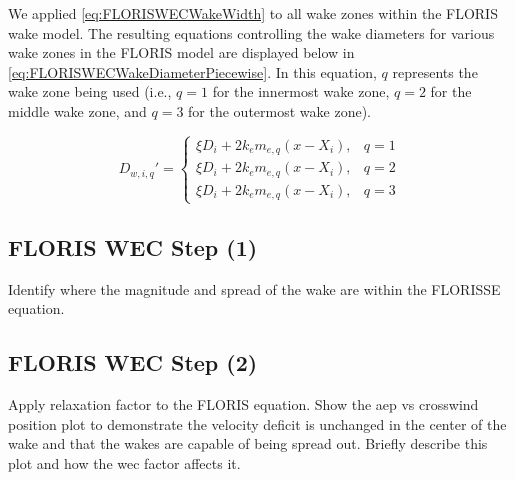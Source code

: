 \documentclass[a4paper]{jpconf}
\begin{document}

We applied \cref{eq:FLORISWECWakeWidth} to all wake zones within the FLORIS wake model. The resulting equations controlling the wake diameters for various wake zones in the FLORIS model are displayed below in \cref{eq:FLORISWECWakeDiameterPiecewise}. In this equation, $q$ represents the wake zone being used (i.e., $q = 1$ for the innermost wake zone, $q = 2$ for the middle wake zone, and $q = 3$ for the outermost wake zone).

\begin{equation}
    D_{w, i, q}' = \begin{cases}
        \xi D_i + 2k_em_{e, q} (x - X_i), & q = 1 \\
        \xi D_i + 2k_em_{e, q} (x - X_i), & q = 2 \\
        \xi D_i + 2k_em_{e, q} (x - X_i), & q = 3
    \end{cases}
    \label{eq:FLORISWECWakeDiameterPiecewise}
\end{equation}

\subsection{FLORIS WEC Step (1)}
Identify where the magnitude and spread of the wake are within the FLORISSE equation.

\subsection{FLORIS WEC Step (2)}
Apply relaxation factor to the FLORIS equation. Show the aep vs crosswind position plot to demonstrate the velocity deficit is unchanged in the center of the wake and that the wakes are capable of being spread out. Briefly describe this plot and how the wec factor affects it.
\end{document}
